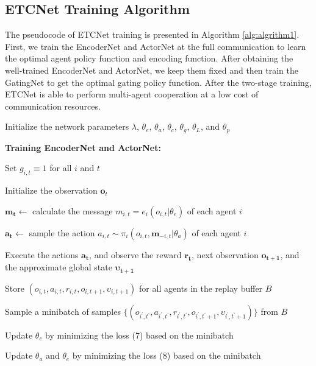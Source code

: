 \documentclass[letterpaper]{article} %
\begin{document}
\subsection*{ETCNet Training Algorithm}\label{sec:Pseudocode}
The pseudocode of ETCNet training is presented in Algorithm \ref{alg:algrithm1}. First, we train the EncoderNet and ActorNet at the full communication to learn the optimal agent policy function and encoding function. After obtaining the well-trained EncoderNet and ActorNet, we keep them fixed and then train the GatingNet to get the optimal gating policy function.
After the two-stage training, ETCNet is able to perform multi-agent cooperation at a low cost of communication resources.
\begin{algorithm*}[h]
\caption{Event-Triggered Communication Network (variables and formulas are defined in the main text).}
\label{alg:algrithm1}
\LinesNumbered

Initialize the network parameters  $\lambda$, $\theta_e$, $\theta_a$, $\theta_c$, $\theta_g$, $\theta_L$, and $\theta_p$

\textbf{Training EncoderNet and ActorNet:}

Set $g_{i,t} \equiv 1$ for all $i$ and $t$

{
    Initialize the observation $\boldsymbol{o}_t$

    {
        $\boldsymbol{m_{t}} \gets$ calculate the message  $m_{i,t}=e_{i}\left( o_{i,t}|\theta_e \right)$ of each agent $i$

        $\boldsymbol{a_{t}} \gets$ sample the action  $a_{i,t} \sim \pi_{i}(o_{i,t},\boldsymbol{m}_{-i,t} | \theta_a)$ of each agent $i$

        Execute the actions $\boldsymbol{a_{t}}$, and
        observe the reward $\boldsymbol{r_{t}}$, next observation $\boldsymbol{o_{t+1}}$, and the approximate global state $\boldsymbol{\upsilon_{t+1}}$

        Store $(o_{i,t}, a_{i,t}, r_{i,t}, o_{i,t+1}, \upsilon_{i,t+1})$ for all agents in the replay buffer $B$

        Sample a minibatch of samples $\{(o_{i^{'},t^{'}}, a_{i^{'},t^{'}}, r_{i^{'},t^{'}}, o_{i^{'},t^{'}+1}, \upsilon_{i^{'},t^{'}+1}) \}$ from $B$

        Update $\theta_c$ by minimizing the loss (7) based on the minibatch

        Update $\theta_a$ and $\theta_e$ by minimizing the loss (8) based on the minibatch
    }
}


\end{algorithm*}
\end{document}
